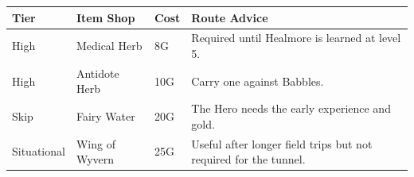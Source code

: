 \documentclass[
  american,
  10pt,
  letterpaper,
  oneside,
  open=any]{scrreprt}
\newcounter{none} %
\newenvironment{guidetable}{%
  \small\setstretch{1.0}%
  \setlength{\tabcolsep}{4pt}%
  \setlength{\LTpre}{8pt}\setlength{\LTpost}{10pt}%
  \renewcommand{\arraystretch}{1.16}%
}{ }
\begin{document}
\begin{guidetable}

{\def\LTcaptype{none} %
\begin{longtable}[]{@{}
  >{\raggedright\arraybackslash}p{}
  >{\raggedright\arraybackslash}p{}
  >{\raggedleft\arraybackslash}p{}
  >{\raggedright\arraybackslash}p{}@{}}
\toprule\noalign{}
\begin{minipage}[b]{\linewidth}\raggedright
\color{GuideGreen}\bfseries Tier
\end{minipage} & \begin{minipage}[b]{\linewidth}\raggedright
\color{GuideGreen}\bfseries Item Shop
\end{minipage} & \begin{minipage}[b]{\linewidth}\raggedleft
\color{GuideGreen}\bfseries Cost
\end{minipage} & \begin{minipage}[b]{\linewidth}\raggedright
\color{GuideGreen}\bfseries Route Advice
\end{minipage} \\
\midrule\noalign{}
\endhead
\bottomrule\noalign{}
\endlastfoot
High & Medical Herb & 8G & Required until Healmore is learned at level
5. \\
High & Antidote Herb & 10G & Carry one against Babbles. \\
Skip & Fairy Water & 20G & The Hero needs the early experience and
gold. \\
Situational & Wing of Wyvern & 25G & Useful after longer field trips but
not required for the tunnel. \\
\end{longtable}
}

\end{guidetable}
\end{document}
